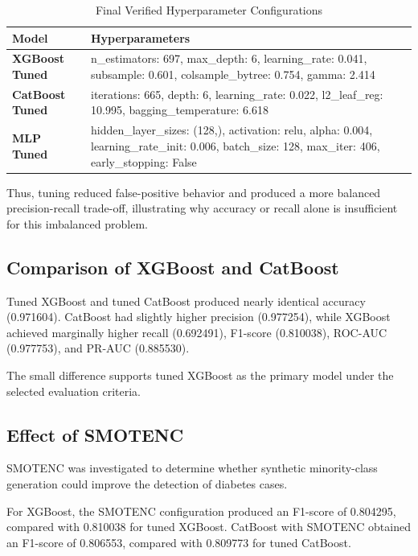 \documentclass[conference]{IEEEtran}
\begin{document}
\begin{table}[!htbp]
\caption{Final Verified Hyperparameter Configurations}
\centering
\scriptsize
\setlength{\tabcolsep}{2pt}
\begin{tabular}{@{}L{1.95cm}L{5.65cm}@{}}
\toprule
\textbf{Model} & \textbf{Hyperparameters} \\
\midrule
\textbf{XGBoost Tuned} & n\_estimators: 697, max\_depth: 6, learning\_rate: 0.041, subsample: 0.601, colsample\_bytree: 0.754, gamma: 2.414 \\
\textbf{CatBoost Tuned} & iterations: 665, depth: 6, learning\_rate: 0.022, l2\_leaf\_reg: 10.995, bagging\_temperature: 6.618 \\
\textbf{MLP Tuned} & hidden\_layer\_sizes: (128,), activation: relu, alpha: 0.004, learning\_rate\_init: 0.006, batch\_size: 128, max\_iter: 406, early\_stopping: False \\
\bottomrule
\end{tabular}
\end{table}
\FloatBarrier

Thus, tuning reduced false-positive behavior and produced a more balanced precision-recall trade-off, illustrating why accuracy or recall alone is insufficient for this imbalanced problem.


\subsection{Comparison of XGBoost and CatBoost}

Tuned XGBoost and tuned CatBoost produced nearly identical accuracy (0.971604). CatBoost had slightly higher precision (0.977254), while XGBoost achieved marginally higher recall (0.692491), F1-score (0.810038), ROC-AUC (0.977753), and PR-AUC (0.885530).

The small difference supports tuned XGBoost as the primary model under the selected evaluation criteria.

\subsection{Effect of SMOTENC}

SMOTENC was investigated to determine whether synthetic minority-class generation could improve the detection of diabetes cases.

For XGBoost, the SMOTENC configuration produced an F1-score of 0.804295, compared with 0.810038 for tuned XGBoost. CatBoost with SMOTENC obtained an F1-score of 0.806553, compared with 0.809773 for tuned CatBoost.
\end{document}
